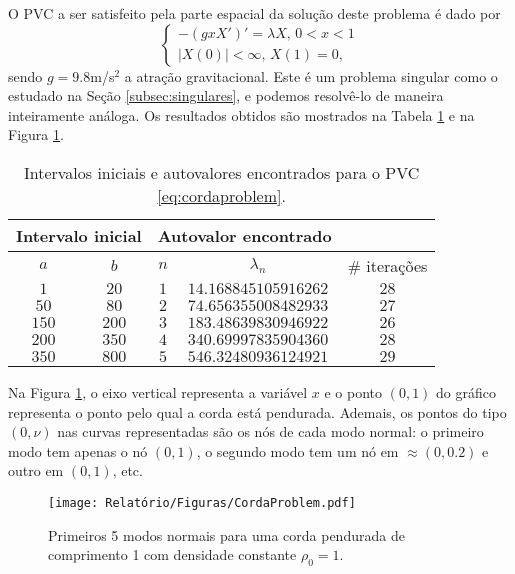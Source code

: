 \documentclass[twocolumn,showpacs,%
  nofootinbib,aps,superscriptaddress,%
  eqsecnum,prd,notitlepage,showkeys,10pt]{revtex4-1}
\begin{document}
O PVC a ser satisfeito pela parte espacial da solução deste problema é dado por
%
\begin{equation}
\label{eq:cordaproblem}
    \left\{
        \begin{array}{l}
            -(gxX')' = \lambda X, \, 0 < x < 1 \\ 
            |X(0)| < \infty, \, X(1) = 0,
        \end{array}
    \right.
\end{equation}
%
sendo $g = 9.8$m/s$^2$ a atração gravitacional. Este é um problema singular como
o estudado na Seção \ref{subsec:singulares}, e podemos resolvê-lo de maneira inteiramente
análoga. Os resultados obtidos são mostrados na Tabela \ref{tab:cordaproblem}
e na Figura \ref{fig:cordaproblem}.
%
\begin{table}[H]
    \centering
    \caption{Intervalos iniciais e autovalores encontrados para o PVC \eqref{eq:cordaproblem}.}
    \begin{tabular}{cc|cc|c}
        \multicolumn{2}{c}{Intervalo inicial} & \multicolumn{2}{c}{Autovalor encontrado} & \\
        \hline
        $a$ & $b$ & $n$ & $\lambda_n$ & \# iterações \\
        \hline
        $1$ & $20$ & $1$ & $14.168845105916262$ & $28$ \\
        $50$ & $80$ & $2$ & $74.656355008482933$ & $27$ \\
        $150$ & $200$ & $3$ & $183.48639830946922$ & $26$ \\
        $200$ & $350$ & $4$ & $340.69997835904360$ & $28$ \\
        $350$ & $800$ & $5$ & $546.32480936124921$ & $29$ \\
        \hline
    \end{tabular}
    \label{tab:cordaproblem}
\end{table}
%
Na Figura \ref{fig:cordaproblem}, o eixo vertical representa a variável $x$
e o ponto $(0,1)$ do gráfico representa o ponto pelo qual a corda está pendurada.
Ademais, os pontos do tipo $(0,\nu)$ nas curvas representadas são os nós
de cada modo normal: o primeiro modo tem apenas o nó $(0,1)$, o segundo modo tem um
nó em $\approx(0,0.2)$ e outro em $(0,1)$, etc.
%
\begin{figure}[H]
    \centering
    \texttt{[image: Relatório/Figuras/CordaProblem.pdf]}
    \caption{Primeiros 5 modos normais para uma corda pendurada de comprimento 1
    com densidade constante $\rho_0 = 1$.}
    \label{fig:cordaproblem}
\end{figure}
%
\end{document}
